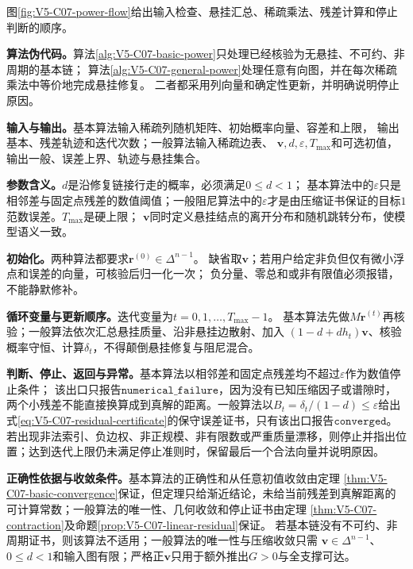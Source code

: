 图\ref{fig:V5-C07-power-flow}给出输入检查、悬挂汇总、稀疏乘法、残差计算和停止判断的顺序。



\label{struct:V5-C07-CH19}
\textbf{算法伪代码。}算法\ref{alg:V5-C07-basic-power}只处理已经核验为无悬挂、不可约、非周期的基本链；
算法\ref{alg:V5-C07-general-power}处理任意有向图，并在每次稀疏乘法中等价地完成悬挂修复。
二者都采用列向量和确定性更新，并明确说明停止原因。

\label{struct:V5-C07-CH20}
\textbf{输入与输出。}基本算法输入稀疏列随机矩阵、初始概率向量、容差和上限，
输出基本\PageRank{}、残差轨迹和迭代次数；一般算法输入稀疏边表、
$\boldsymbol v,d,\varepsilon,T_{\max}$和可选初值，输出一般\PageRank{}、误差上界、轨迹与悬挂集合。

\label{struct:V5-C07-CH21}
\textbf{参数含义。}$d$是沿修复链接行走的概率，必须满足$0\le d<1$；
基本算法中的$\varepsilon$只是相邻差与固定点残差的数值阈值；一般阻尼算法中的$\varepsilon$才是由压缩证书保证的目标$1$范数误差。$T_{\max}$是硬上限；
$\boldsymbol v$同时定义悬挂结点的离开分布和随机跳转分布，使模型语义一致。

\label{struct:V5-C07-CH22}
\textbf{初始化。}两种算法都要求$\boldsymbol r^{(0)}\in\Delta^{n-1}$。
缺省取$\boldsymbol v$；若用户给定非负但仅有微小浮点和误差的向量，可核验后归一化一次；
负分量、零总和或非有限值必须报错，不能静默修补。

\label{struct:V5-C07-CH23}
\textbf{循环变量与更新顺序。}迭代变量为$t=0,1,\ldots,T_{\max}-1$。
基本算法先做$M\boldsymbol r^{(t)}$再核验；一般算法依次汇总悬挂质量、沿非悬挂边散射、加入
$(1-d+dh_t)\boldsymbol v$、核验概率守恒、计算$\delta_t$，不得颠倒悬挂修复与阻尼混合。

\label{struct:V5-C07-CH24}
\textbf{判断、停止、返回与异常。}基本算法以相邻差和固定点残差均不超过$\varepsilon$作为数值停止条件；
该出口只报告$\mathtt{numerical\_failure}$，因为没有已知压缩因子或谱隙时，两个小残差不能直接换算成到真解的距离。一般算法以$B_t=\delta_t/(1-d)\le\varepsilon$给出式\eqref{eq:V5-C07-residual-certificate}的保守误差证书，只有该出口报告$\mathtt{converged}$。
若出现非法索引、负边权、非正规模、非有限数或严重质量漂移，则停止并指出位置；达到迭代上限仍未满足停止准则时，保留最后一个合法向量并说明原因。

\label{struct:V5-C07-CH25}
\textbf{正确性依据与收敛条件。}基本算法的正确性和从任意初值收敛由定理
\ref{thm:V5-C07-basic-convergence}保证，但定理只给渐近结论，未给当前残差到真解距离的可计算常数；一般算法的唯一性、几何收敛和停止证书由定理
\ref{thm:V5-C07-contraction}及命题\ref{prop:V5-C07-linear-residual}保证。
若基本链没有不可约、非周期证书，则该算法不适用；一般算法的唯一性与压缩收敛只需
$\boldsymbol v\in\Delta^{n-1}$、$0\le d<1$和输入图有限；严格正$\boldsymbol v$只用于额外推出$G>0$与全支撑可达。


